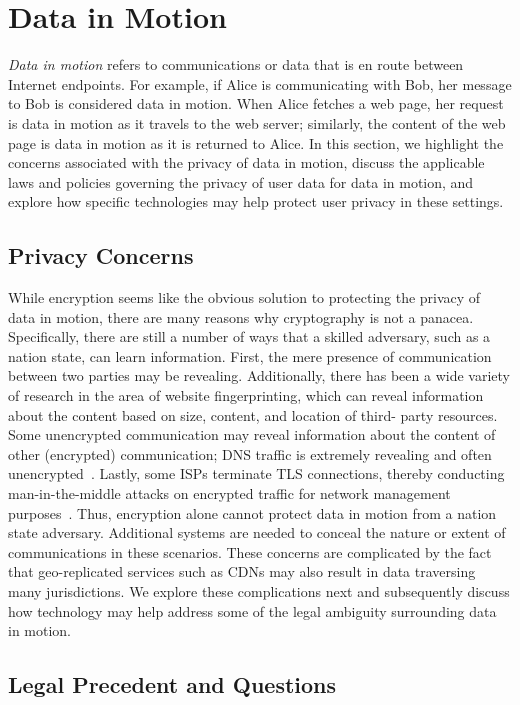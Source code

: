 \section{Data in Motion}
\label{sec:motion}

{\em Data in motion} refers to communications or data that is en route between
Internet endpoints. For example, if Alice is communicating with Bob, her
message to Bob is considered data in motion.  When Alice fetches a web page,
her request is data in motion as it travels to the web server; similarly, the
content of the web page is data in motion as it is returned to Alice. In this
section, we highlight the concerns associated with the privacy of data in
motion, discuss the applicable laws and policies governing the privacy of user
data for data in motion, and explore how specific technologies may help protect
user privacy in these settings.

\subsection{Privacy Concerns}

While encryption seems like the obvious solution to protecting the privacy of
data in motion, there are many reasons why cryptography is not a panacea.
Specifically, there are still a number of ways that a skilled adversary, such
as a nation state, can learn information.  First, the mere presence of
communication between two parties may be revealing.  Additionally, there has
been a wide variety of research in the area of website fingerprinting, which
can reveal information about the content based on size, content, and location
of third- party resources.  Some unencrypted communication may reveal
information about the content of other (encrypted) communication; DNS traffic
is extremely revealing and often unencrypted~\cite{isps_see}.  Lastly, some
ISPs terminate TLS connections, thereby conducting man-in-the-middle attacks
on encrypted traffic for network management purposes~\cite{gogo}. Thus,
encryption alone cannot protect data in motion from a nation state adversary.
Additional systems are needed to conceal the nature or extent of
communications in these scenarios. These concerns are complicated by the fact
that geo-replicated services such as CDNs may also result in data traversing
many jurisdictions.  We explore these complications next and subsequently
discuss how technology may help address some of the legal ambiguity
surrounding data in motion.

\subsection{Legal Precedent and Questions}

